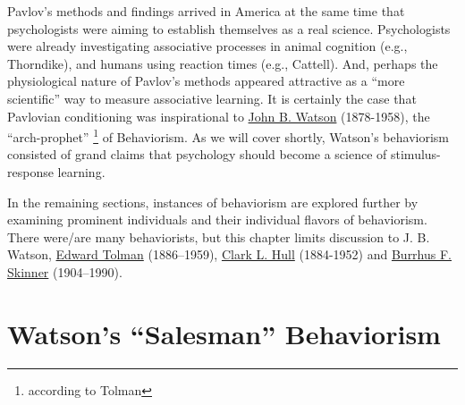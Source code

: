 \documentclass[
  oneside,
  12pt]{crumpbook}
\begin{document}
Pavlov's methods and findings arrived in America at the same time that psychologists were aiming to establish themselves as a real science. Psychologists were already investigating associative processes in animal cognition (e.g., Thorndike), and humans using reaction times (e.g., Cattell). And, perhaps the physiological nature of Pavlov's methods appeared attractive as a ``more scientific'' way to measure associative learning. It is certainly the case that Pavlovian conditioning was inspirational to \href{https://en.wikipedia.org/wiki/John_B._Watson}{John B. Watson} (1878-1958), the ``arch-prophet'' \footnote{according to Tolman} of Behaviorism. As we will cover shortly, Watson's behaviorism consisted of grand claims that psychology should become a science of stimulus-response learning.

In the remaining sections, instances of behaviorism are explored further by examining prominent individuals and their individual flavors of behaviorism. There were/are many behaviorists, but this chapter limits discussion to J. B. Watson, \href{https://en.wikipedia.org/wiki/Edward_C._Tolman}{Edward Tolman} (1886--1959), \href{https://en.wikipedia.org/wiki/Clark_L._Hull}{Clark L. Hull} (1884-1952) and \href{https://en.wikipedia.org/wiki/B._F._Skinner}{Burrhus F. Skinner} (1904--1990).

\hypertarget{watsons-salesman-behaviorism}{%
\section{Watson's ``Salesman'' Behaviorism}\label{watsons-salesman-behaviorism}}
\end{document}
